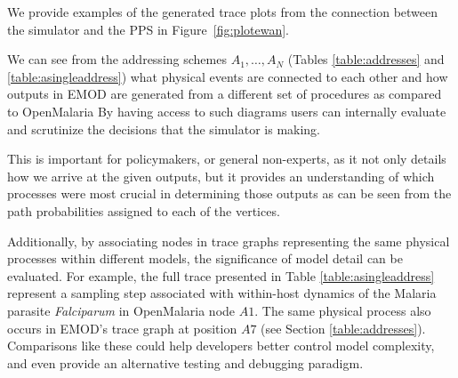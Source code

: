 \documentclass{article}
\begin{document}
We provide examples of the generated trace plots from the connection between the simulator and the PPS in Figure~\ref{fig:plotewan}. 

We can see from the addressing schemes $A_1, \ldots, A_N$ (Tables \ref{table:addresses} and \ref{table:asingleaddress}) what physical events are connected to each other and how outputs in EMOD are generated from a different set of procedures as compared to OpenMalaria 
By having access to such diagrams users can internally evaluate and scrutinize the decisions that the simulator is making.

This is important for policymakers, or general non-experts, as it not only details how we arrive at the given outputs, but it provides an understanding of which processes were most crucial in determining those outputs as can be seen from the path probabilities assigned to each of the vertices. 

Additionally, by associating nodes in trace graphs representing the same physical processes within different models, the significance of model detail can be evaluated. For example, the full trace presented in Table \ref{table:asingleaddress} represent a sampling step associated with within-host dynamics of the Malaria parasite \textit{Falciparum} in OpenMalaria node $A1$. The same physical process also occurs in EMOD's trace graph at position $A7$ (see Section \ref{table:addresses}).
Comparisons like these could help developers better control model complexity, and even provide an alternative testing and debugging paradigm.






\end{document}
